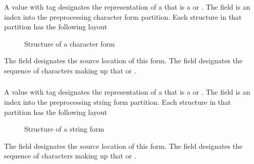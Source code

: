 
\subsubsection{}
\label{sec:ifc:FormSort:Character}

A  value with tag  designates
the representation of a  that 
is a  or .
The  field is an index into
the preprocessing character form partition.  Each structure in that partition
has the following layout
%
\begin{figure}[H]
  \centering
  \caption{Structure of a character form}
  \label{fig:ifc-character-form}
\end{figure}

The field  designates the source location of this form.  The
field  designates the sequence of characters making up that 
 or . 


\subsubsection{}
\label{sec:ifc:FormSort:String}

A  value with tag  designates
the representation of a  that 
is a  or .
The  field is an index into
the preprocessing string form partition.  Each structure in that partition
has the following layout
%
\begin{figure}[H]
  \centering
  \caption{Structure of a string form}
  \label{fig:ifc-string-form}
\end{figure}

The field  designates the source location of this form.  The
field  designates the sequence of characters making up that 
 or . 

